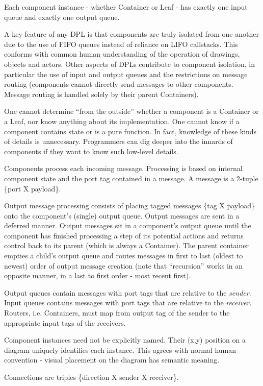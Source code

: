 \documentclass[10pt,anonymous,review]{acmart}
\begin{document}
Each component instance - whether Container or Leaf - has exactly one input queue and exactly one output queue.

A key feature of any DPL is that components are truly isolated from one another due to the use of FIFO queues instead of reliance on LIFO callstacks. This conforms with common human understanding of the operation of drawings, objects and actors. Other aspects of DPLs contribute to component isolation, in particular the use of input and output queues and the restrictions on message routing (components cannot directly send messages to other components. Message routing is handled solely by their parent Containers).

One cannot determine “from the outside” whether a component is a Container or a Leaf, nor know anything about its implementation. One cannot know if a component contains state or is a pure function. In fact, knowledge of these kinds of details is unnecessary. Programmers can dig deeper into the innards of components if they want to know such low-level details.

Components process each incoming message. Processing is based on internal component state and the port tag contained in a message. A message is a 2-tuple \{port X payload\}.

Output message processing consists of placing tagged messages \{tag X payload\} onto the component’s (single) output queue. Output messages are sent in a deferred manner. Output messages sit in a component’s output queue until the component has finished processing a step of its potential actions and returns control back to its parent (which is always a Container). The parent container empties a child’s output queue and routes messages in first to last (oldest to newest) order of output message creation (note that “recursion” works in an opposite manner, in a last to first order - most recent first).

Output queues contain messages with port tags that are relative to the \emph{sender}. Input queues contains messages with port tags that are relative to the \emph{receiver}. Routers, i.e. Containers, must map from output tag of the sender to the appropriate input tags of the receivers.

Component instances need not be explicitly named. Their (x,y) position on a diagram uniquely identifies each instance. This agrees with normal human convention - visual placement on the diagram has semantic meaning.


Connections are triples \{direction X sender X receiver\}.
\end{document}
